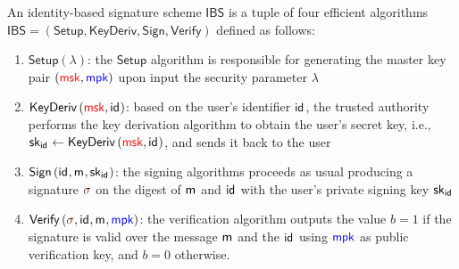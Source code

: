 \documentclass[version=submission, floatrow]{iacrcc}
\begin{document}
\begin{definition} 
An identity-based signature scheme $\mathsf{IBS}$ is a tuple of four efficient algorithms $\mathsf{IBS} = \left(\mathsf{Setup}, \mathsf{KeyDeriv}, \mathsf{Sign}, \mathsf{Verify}\right)$ defined as follows:\begin{enumerate}[label={\emph{\roman*})}]
    \item $\mathsf{Setup}(\lambda)$: the $\mathsf{Setup}$ algorithm is responsible for generating the master key pair $\left(\textcolor{red}{\mathsf{msk}}, \textcolor{blue}{\mathsf{mpk}}\right)$ upon input the security parameter $\lambda$
    \item $\mathsf{KeyDeriv}\left(\textcolor{red}{\mathsf{msk}}, \mathsf{id}_{}\right)$: based on the user's identifier $\mathsf{id}_{}$, the trusted authority performs the key derivation algorithm to obtain the user's secret key, i.e., $\mathsf{sk}_{\mathsf{id}_{}} \leftarrow \mathsf{KeyDeriv}\left(\textcolor{red}{\mathsf{msk}}, \mathsf{id}_{}\right)$, and sends it back to the user
    \item $\mathsf{Sign}\left(\mathsf{id}_{}, \mathsf{m}_{}, \mathsf{sk}{}_{\mathsf{id}_{}}\right)$: the signing algorithms proceeds as usual producing a signature $\Signature{}$ on the digest of $\mathsf{m}_{}$ and $\mathsf{id}_{}$ with the user's private signing key $\mathsf{sk}_{\mathsf{id}_{}}$
    \item $\Verify{\Signature{}, \id{}, \msg{}, \mpk}$: the verification algorithm outputs the value $b = 1$ if the signature is valid over the message $\mathsf{m}_{}$ and the $\mathsf{id}_{}$ using $\textcolor{blue}{\mathsf{mpk}}$ as public verification key, and $b = 0$ otherwise.
\end{enumerate}
\end{definition}
\end{document}
